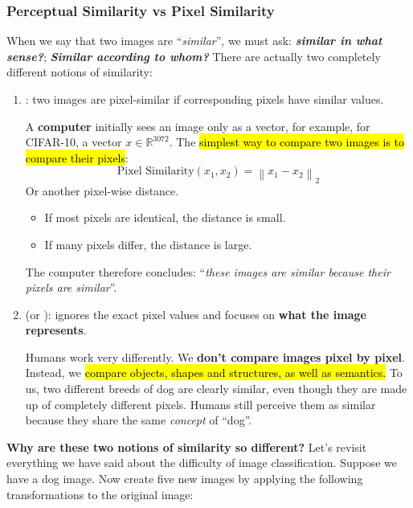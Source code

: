 \subsubsection{Perceptual Similarity vs Pixel Similarity}\label{sec:perceptual-similarity-vs-pixel-similarity}

When we say that two images are ``\emph{similar}'', we must ask: \emph{\textbf{similar in what sense?}}; \emph{\textbf{Similar according to whom?}} There are actually two completely different notions of similarity:
\begin{enumerate}
    \item {}: two images are pixel-similar if corresponding pixels have similar values.
    
    \highspace
    A \textbf{computer} initially sees an image only as a vector, for example, for CIFAR-10, a vector $x \in \mathbb{R}^{3072}$. The \hl{simplest way to compare two images is to compare their pixels}:
    \begin{equation*}
        \text{Pixel Similarity}(x_1, x_2) = \left\|x_1 - x_2\right\|_{2}
    \end{equation*}
    Or another pixel-wise distance.
    \begin{itemize}
        \item If most pixels are identical, the distance is small.
        \item If many pixels differ, the distance is large.
    \end{itemize}
    The computer therefore concludes: ``\emph{these images are similar because their pixels are similar}''.
    
    
    \item {} (or ): ignores the exact pixel values and focuses on \textbf{what the image represents}.
    
    \highspace
    Humans work very differently. We \textbf{don't compare images pixel by pixel}. Instead, we \hl{compare objects, shapes and structures, as well as semantics.} To us, two different breeds of dog are clearly similar, even though they are made up of completely different pixels. Humans still perceive them as similar because they share the same \emph{concept} of ``dog''.
\end{enumerate}
\textcolor{Green3}{ \textbf{Why are these two notions of similarity so different?}} Let's revisit everything we have said about the difficulty of image classification. Suppose we have a dog image. Now create five new images by applying the following transformations to the original image:
